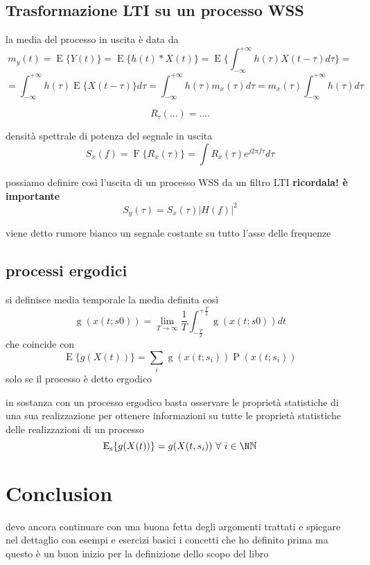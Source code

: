 \documentclass{article}
\begin{document}
\subsection{Trasformazione LTI su un processo WSS}
la media del processo in uscita è data da
$$m_y(t) = \operatorname{E}\{Y(t)\} = \operatorname{E}\{h(t)*X(t)\} =
\operatorname{E}\{ \int_{-\infty}^{+\infty} h(\tau) X(t-\tau) d\tau \} =
$$$$= \int_{-\infty}^{+\infty} h(\tau) \operatorname{E}\{  X(t-\tau) \} d\tau =
\int_{-\infty}^{+\infty} h(\tau) m_x(\tau) d\tau =  m_x(\tau) \int_{-\infty}^{+\infty} h(\tau) d\tau$$

$$R_\tau(...) = ....$$

densità spettrale di potenza del segnale in uscita
$$S_x(f) = \operatorname{F}\{R_x(\tau)\} = \int R_x(\tau) e^{j 2\pi f \tau} d\tau$$

possiamo definire così l'uscita di un processo WSS da un filtro LTI \textbf{ricordala! è importante}
$$S_y(\tau) = S_x(\tau)|H(f)|^2$$

viene detto rumore bianco un segnale costante su tutto l'asse delle frequenze

\subsection{processi ergodici}
si definisce media temporale la media definita così
$$\operatorname{g}(x(t;s0)) =
\lim_{T \to \infty} \frac{1}{T} \int_{-\frac{T}{2}}^{+\frac{T}{2}} \operatorname{g}(x(t;s0)) dt$$
che coincide con
$$\operatorname{E}\{g(X(t))\} = \sum_i \operatorname{g}(x(t;s_i)) \operatorname{P}(x(t;s_i)) $$
solo se il processo è detto ergodico

in sostanza con un processo ergodico basta osservare le proprietà statistiche di una sua realizzazione per
ottenere informazioni su tutte le proprietà statistiche delle realizzazioni di un processo
$$\operatorname{E_s}\{g(X(t))\} = g(X(t,s_i)) \ \forall \ i \in \N \mathbb{N}$$

\section{Conclusion}
devo ancora continuare con una buona fetta degli argomenti trattati e spiegare nel dettaglio con esempi e esercizi basici i concetti che ho definito prima ma questo è un buon inizio per la definizione dello scopo del libro
\end{document}
